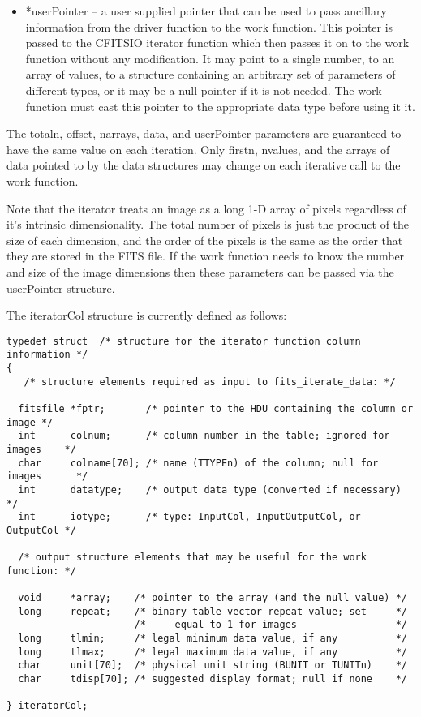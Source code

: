 \documentclass[11pt]{book}
\begin{document}
\begin{itemize}
\item
  *userPointer -- a user supplied pointer that can be used
                 to pass ancillary information from the driver function
                 to the work function.
                 This pointer is passed to the CFITSIO iterator function
                 which then passes it on to the
                 work function without any modification.
                 It may point to a single number, to an array of values,
                 to a structure containing an arbitrary set of parameters
                 of different types,
                 or it may be a null pointer if it is not needed.
                 The work function must cast this pointer to the
                 appropriate data type before using it it.
\end{itemize}

The totaln, offset, narrays, data, and userPointer parameters are
guaranteed to have the same value on each iteration.  Only firstn,
nvalues, and the arrays of data pointed to by the data structures may
change on each iterative call to the work function.

Note that the iterator treats an image as a long 1-D array of pixels
regardless of it's intrinsic dimensionality.  The total number of
pixels is just the product of the size of each dimension, and the order
of the pixels is the same as the order that they are stored in the FITS
file. If the work function needs to know the number and size of the
image dimensions then these parameters can be passed via the
userPointer structure.

The iteratorCol structure is currently defined as follows:

\begin{verbatim}
typedef struct  /* structure for the iterator function column information */
{
   /* structure elements required as input to fits_iterate_data: */

  fitsfile *fptr;       /* pointer to the HDU containing the column or image */
  int      colnum;      /* column number in the table; ignored for images    */
  char     colname[70]; /* name (TTYPEn) of the column; null for images      */
  int      datatype;    /* output data type (converted if necessary) */
  int      iotype;      /* type: InputCol, InputOutputCol, or OutputCol */

  /* output structure elements that may be useful for the work function: */

  void     *array;    /* pointer to the array (and the null value) */
  long     repeat;    /* binary table vector repeat value; set     */
                      /*     equal to 1 for images                 */
  long     tlmin;     /* legal minimum data value, if any          */
  long     tlmax;     /* legal maximum data value, if any          */
  char     unit[70];  /* physical unit string (BUNIT or TUNITn)    */
  char     tdisp[70]; /* suggested display format; null if none    */

} iteratorCol;
\end{verbatim}
\end{document}
